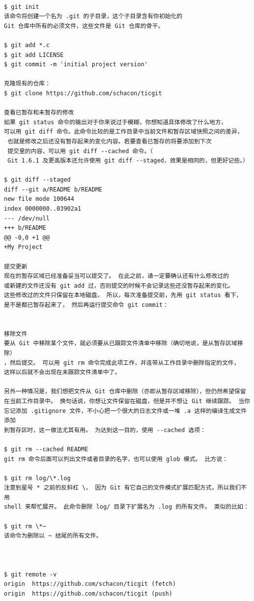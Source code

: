 \begin{verbatim}

$ git init
该命令将创建一个名为 .git 的子目录，这个子目录含有你初始化的 
Git 仓库中所有的必须文件，这些文件是 Git 仓库的骨干。

$ git add *.c
$ git add LICENSE
$ git commit -m 'initial project version'

克隆现有的仓库：
$ git clone https://github.com/schacon/ticgit

查看已暂存和未暂存的修改
如果 git status 命令的输出对于你来说过于模糊，你想知道具体修改了什么地方，
可以用 git diff 命令。此命令比较的是工作目录中当前文件和暂存区域快照之间的差异，
 也就是修改之后还没有暂存起来的变化内容。若要查看已暂存的将要添加到下次
 提交里的内容，可以用 git diff --cached 命令。（
 Git 1.6.1 及更高版本还允许使用 git diff --staged，效果是相同的，但更好记些。）

$ git diff --staged
diff --git a/README b/README
new file mode 100644
index 0000000..03902a1
--- /dev/null
+++ b/README
@@ -0,0 +1 @@
+My Project

提交更新
现在的暂存区域已经准备妥当可以提交了。 在此之前，请一定要确认还有什么修改过的
或新建的文件还没有 git add 过，否则提交的时候不会记录这些还没暂存起来的变化。 
这些修改过的文件只保留在本地磁盘。 所以，每次准备提交前，先用 git status 看下，
是不是都已暂存起来了， 然后再运行提交命令 git commit：


移除文件
要从 Git 中移除某个文件，就必须要从已跟踪文件清单中移除（确切地说，是从暂存区域移除）
，然后提交。 可以用 git rm 命令完成此项工作，并连带从工作目录中删除指定的文件，
这样以后就不会出现在未跟踪文件清单中了。

另外一种情况是，我们想把文件从 Git 仓库中删除（亦即从暂存区域移除），但仍然希望保留
在当前工作目录中。 换句话说，你想让文件保留在磁盘，但是并不想让 Git 继续跟踪。 当你
忘记添加 .gitignore 文件，不小心把一个很大的日志文件或一堆 .a 这样的编译生成文件添加
到暂存区时，这一做法尤其有用。 为达到这一目的，使用 --cached 选项：

$ git rm --cached README
git rm 命令后面可以列出文件或者目录的名字，也可以使用 glob 模式。 比方说：

$ git rm log/\*.log
注意到星号 * 之前的反斜杠 \， 因为 Git 有它自己的文件模式扩展匹配方式，所以我们不用 
shell 来帮忙展开。 此命令删除 log/ 目录下扩展名为 .log 的所有文件。 类似的比如：

$ git rm \*~
该命令为删除以 ~ 结尾的所有文件。



$ git remote -v
origin	https://github.com/schacon/ticgit (fetch)
origin	https://github.com/schacon/ticgit (push)


\end{verbatim}
